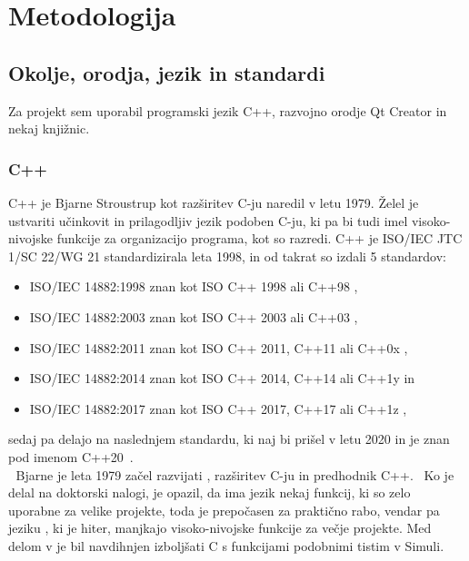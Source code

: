 \documentclass[12pt]{report}
\newcommand{\wdot}{\textcolor{white}{.}}
\newcommand{\odstavek}{\wdot \\ \wdot \qquad}
\begin{document}
\chapter{Metodologija}
\label{methods}
	\section{Okolje, orodja, jezik in standardi}
		Za projekt sem uporabil programski jezik C++, razvojno orodje Qt Creator in nekaj knjižnic.
		\subsection{C++}
			C++ je Bjarne Stroustrup kot razširitev C-ju naredil v letu 1979.
			Želel je ustvariti učinkovit in prilagodljiv jezik podoben C-ju, ki pa bi tudi imel visoko-nivojske funkcije za organizacijo programa, kot so razredi.
			C++ je ISO/IEC JTC 1/SC 22/WG 21 standardizirala leta 1998, in od takrat so izdali 5 standardov:\\
			\parbox{\textwidth}{
			\begin{itemize}
				\item ISO/IEC 14882:1998\cite{cpp98} znan kot ISO C++ 1998 ali C++98 \cite{cpp_naming,cpp_ref,cpp_evolution},
				\item ISO/IEC 14882:2003\cite{cpp03} znan kot ISO C++ 2003 ali C++03 \cite{cpp_naming,cpp_ref,cpp_evolution},
				\item ISO/IEC 14882:2011\cite{cpp11} znan kot ISO C++ 2011, C++11 ali C++0x \cite{cpp_naming,cpp_ref,cpp_evolution},
				\item ISO/IEC 14882:2014\cite{cpp14} znan kot ISO C++ 2014, C++14 ali C++1y \cite{cpp_naming,cpp_ref,cpp_evolution} in
				\item ISO/IEC 14882:2017\cite{cpp17} znan kot ISO C++ 2017, C++17 ali C++1z \cite{cpp_naming,cpp_ref,cpp_evolution},
			\end{itemize}}
			sedaj pa delajo na naslednjem standardu, ki naj bi prišel v letu 2020 in je znan pod imenom C++20~\cite{cpp_naming,cpp_ref,cpp20_naming}.
			\odstavek
			Bjarne je leta 1979 začel razvijati , razširitev C-ju in predhodnik C++.~\cite{cpp_evolution}
			Ko je delal na doktorski nalogi, je opazil, da ima jezik  nekaj funkcij, ki so zelo uporabne za velike projekte, toda je prepočasen za praktično rabo, vendar pa jeziku , ki je hiter, manjkajo visoko-nivojske funkcije za večje projekte.
			Med delom v  je bil navdihnjen izboljšati C s funkcijami podobnimi tistim v Simuli.
\end{document}
